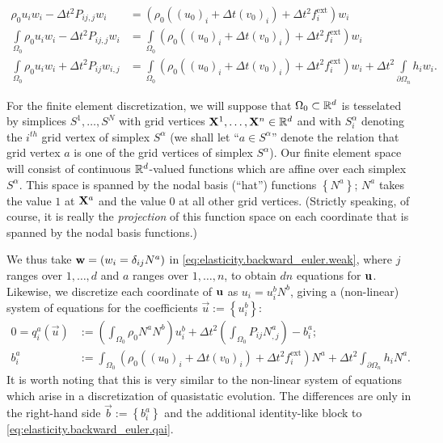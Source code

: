 \begin{subequations}
\begin{align}
\rho_0 u_i w_i - \Delta t^2 P_{ij,j} w_i & = \left( \rho_0 \left( (u_0)_i + \Delta t (v_0)_i \right) + \Delta t^2 f^{\text{ext}}_i \right) w_i \\
\int\limits_{\Omega_0} \!\! \rho_0 u_i w_i - \Delta t^2 P_{ij,j} w_i & = \int\limits_{\Omega_0} \!\! \left( \rho_0 \left( (u_0)_i + \Delta t (v_0)_i \right) + \Delta t^2 f^{\text{ext}}_i \right) w_i \\
\int\limits_{\Omega_0} \!\! \rho_0 u_i w_i + \Delta t^2 P_{ij} w_{i,j} & = \int\limits_{\Omega_0} \!\! \left( \rho_0 \left( (u_0)_i + \Delta t (v_0)_i \right) + \Delta t^2 f^{\text{ext}}_i \right) w_i + \Delta t^2 \!\!\! \int\limits_{\partial \Omega_n} \!\!\! h_i w_i. \label{eq:elasticity.backward_euler.weak}
\end{align}
\end{subequations}

For the finite element discretization, we will suppose that $\Omega_0 \subset \mathbb{R}^d$ is tesselated by simplices $S^1, \dotsc, S^N$ with grid vertices $\mathbf{X}^1, \dotsc, \mathbf{X}^n \in \mathbb{R}^d$ and with $S^{\alpha}_i$ denoting the $i^{th}$ grid vertex of simplex $S^{\alpha}$ (we shall let ``$a \in S^{\alpha}$'' denote the relation that grid vertex $a$ is one of the grid vertices of simplex $S^{\alpha}$). Our finite element space will consist of continuous $\mathbb{R}^d$-valued functions which are affine over each simplex $S^{\alpha}$. This space is spanned by the nodal basis (``hat'') functions $\left\{ N^a \right\}$; $N^a$ takes the value $1$ at $\mathbf{X}^a$ and the value $0$ at all other grid vertices. (Strictly speaking, of course, it is really the {\em projection} of this function space on each coordinate that is spanned by the nodal basis functions.)

We thus take $\mathbf{w} = \left( w_i = \delta_{ij} N^a \right)$ in \eqref{eq:elasticity.backward_euler.weak}, where $j$ ranges over $1, \dotsc, d$ and $a$ ranges over $1, \dotsc, n$, to obtain $d n$ equations for $\mathbf{u}$. Likewise, we discretize each coordinate of $\mathbf{u}$ as $u_i = u_i^b N^b$, giving a (non-linear) system of equations for the coefficients $\vec{u} := \left\{ u_i^b \right\}$:
\begin{subequations}\label{eq:elasticity.backward_euler.qb}
\begin{align}
0 = q^a_i \left( \vec{u} \right) & := \left( \int_{\Omega_0} \rho_0 N^a N^b \right) u_i^b + \Delta t^2 \left( \int_{\Omega_0} P_{ij} N^a_{,j} \right) - b^a_i; \label{eq:elasticity.backward_euler.qai} \\
b^a_i & := \int_{\Omega_0} \left( \rho_0 \left( (u_0)_i + \Delta t (v_0)_i \right) + \Delta t^2 f^{\text{ext}}_i \right) N^a + \Delta t^2 \int_{\partial \Omega_n} h_i N^a.
\end{align}
\end{subequations}
It is worth noting that this is very similar to the non-linear system of equations which arise in a discretization of quasistatic evolution. The differences are only in the right-hand side $\vec{b} := \left\{ b_i^a \right\}$ and the additional identity-like block to \eqref{eq:elasticity.backward_euler.qai}.

